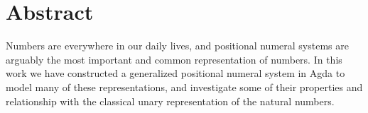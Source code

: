 \documentclass[\main/thesis.tex]{subfiles}
\begin{document}
\chapter*{Abstract}
Numbers are everywhere in our daily lives, and positional numeral systems are
arguably the most important and common representation of numbers. In this work
we have constructed a generalized positional numeral system in Agda to model many
of these representations, and investigate some of their properties and relationship
with the classical unary representation of the natural numbers.

\end{document}
